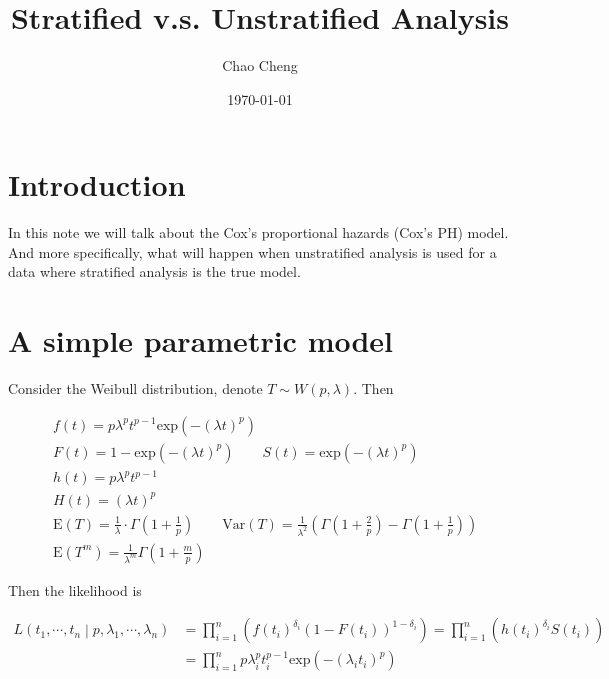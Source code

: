 \documentclass[a4paper,12pt]{article}
\title{Stratified v.s. Unstratified Analysis}
\author{Chao Cheng}
\date{\today}
\begin{document}
\maketitle
\tableofcontents{}

\section{Introduction}
\label{sec:introduction}

In this note we will talk about the Cox's proportional hazards (Cox's PH) model. And more specifically, what will happen when unstratified analysis is used for a data where stratified analysis is the true model. 

\section{A simple parametric model}
\label{sec:simple-param-model}

Consider the Weibull distribution, denote $T \sim W(p, \lambda)$. Then

\[
  \begin{aligned}
    & f\left(t\right) = p\lambda^pt^{p - 1}\mathrm{exp}\left(-\left(\lambda t\right)^p\right)    \\
    & F\left(t\right) = 1 - \mathrm{exp}\left(-\left(\lambda t\right)^p\right)
      \quad\quad S\left(t\right) = \mathrm{exp}\left(-\left(\lambda t\right)^p\right)    \\
    & h\left(t\right) = p\lambda^pt^{p - 1}    \\
    & H\left(t\right) = \left(\lambda t\right)^p    \\
    & \mathrm{E}\left(T\right) = \frac{1}{\lambda} \cdot \Gamma\left(1 + \frac{1}{p}\right)
      \quad\quad \mathrm{Var}\left(T\right) = \frac{1}{\lambda^2}\left(
      \Gamma\left(1 + \frac{2}{p}\right)
      - \Gamma\left(1 + \frac{1}{p}\right)
      \right)    \\
    & \mathrm{E}\left(T^m\right) = \frac{1}{\lambda^m}\Gamma\left(1 + \frac{m}{p}\right)
  \end{aligned}
\]

Then the likelihood is

\begin{equation}
  \label{eq:weibull_likelihood}
  \begin{aligned}
    L\left(t_1, \cdots, t_n\middle|p, \lambda_1, \cdots, \lambda_n\right)
    &= \prod\limits_{i = 1}^n\left(
    f(t_i)^{\delta_i}\left(1 - F\left(t_i\right)\right)^{1 - \delta_i}
    \right)
    = \prod\limits_{i = 1}^n\left(
    h\left(t_i\right)^{\delta_i}S\left(t_i\right)
    \right)    \\
    &= \prod\limits_{i = 1}^n
      p\lambda_i^{p}t_i^{p - 1}
      \mathrm{exp}\left(-\left(\lambda_i t_i\right)^p\right)
  \end{aligned}
\end{equation}
\end{document}
